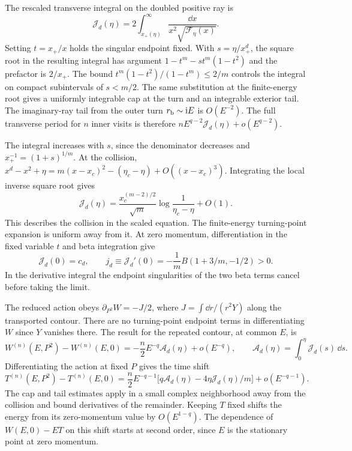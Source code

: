 The rescaled transverse integral on the doubled positive ray
is
\begin{equation}
 \mathcal J_d(\eta)=2\int_{x_+(\eta)}^\infty
    \frac{\dd x}{x^2\sqrt{\mathcal F_\eta(x)}}.
 \label{eq:einstein-transverse-period}
\end{equation}
Setting \(t=x_+/x\) holds the singular endpoint fixed. With
\(s=\eta/x_+^d\), the square root in the resulting integral has
argument \(1-t^m-s t^m(1-t^2)\) and the prefactor is \(2/x_+\).
The bound \(t^m(1-t^2)/(1-t^m)\leq2/m\) controls the integral
on compact subintervals of \(s<m/2\). The same substitution
at the finite-energy root gives a uniformly integrable cap at
the turn and an integrable exterior tail. The imaginary-ray
tail from the outer turn \(r_{\rm b}\sim\mathrm{i} E\) is \(O(E^{-2})\).
The full transverse period for \(n\) inner visits is therefore
\(nE^{q-2}\mathcal J_d(\eta)+o(E^{q-2})\).

The integral increases with \(s\), since the denominator
decreases and \(x_+^{-1}=(1+s)^{1/m}\). At the collision,
\(x^d-x^2+\eta=m(x-x_c)^2-(\eta_c-\eta)+O((x-x_c)^3)\).
Integrating the local inverse square root gives
\begin{equation}
 \mathcal J_d(\eta)=
 \frac{x_c^{(m-2)/2}}{\sqrt m}\log\frac{1}{\eta_c-\eta}+O(1).
\end{equation}
This describes the collision in the scaled equation. The
finite-energy turning-point expansion is uniform away from it.
At zero momentum, differentiation in the fixed variable \(t\)
and beta integration give
\begin{equation}
 \mathcal J_d(0)=c_d,\qquad
 j_d\equiv \mathcal J_d'(0)
     =-\frac{1}{m}B(1+3/m,-1/2)>0.
 \label{eq:einstein-transverse-slope}
\end{equation}
In the derivative integral the endpoint singularities of the
two beta terms cancel before taking the limit.

The reduced action obeys \(\partial_{P^2}W=-J/2\), where
\(J=\int \dd r/(r^2Y)\) along the transported contour. There
are no turning-point endpoint terms in differentiating \(W\)
since \(Y\) vanishes there. The result for the repeated contour,
at common \(E\), is
\begin{equation}
 W^{(n)}(E,P^2)-W^{(n)}(E,0)
   =-\frac{n}{2}E^{-q}\mathcal A_d(\eta)+o(E^{-q}),
 \qquad \mathcal A_d(\eta)=\int_0^\eta\mathcal J_d(s)\,\dd s .
 \label{eq:einstein-transverse-action}
\end{equation}
Differentiating the action at fixed \(P\) gives the time shift
\begin{equation}
 T^{(n)}(E,P^2)-T^{(n)}(E,0)
   =\frac{n}{2}E^{-q-1}
     \big[q\mathcal A_d(\eta)-4\eta\mathcal J_d(\eta)/m\big]
        +o(E^{-q-1}).
 \label{eq:einstein-transverse-time}
\end{equation}
The cap and tail estimates apply in a small complex neighborhood
away from the collision and bound derivatives of the remainder.
Keeping \(T\) fixed shifts the energy from its
zero-momentum value by \(O(E^{1-q})\). The dependence of
\(W(E,0)-ET\) on this shift starts at second order, since \(E\)
is the stationary point at zero momentum.


